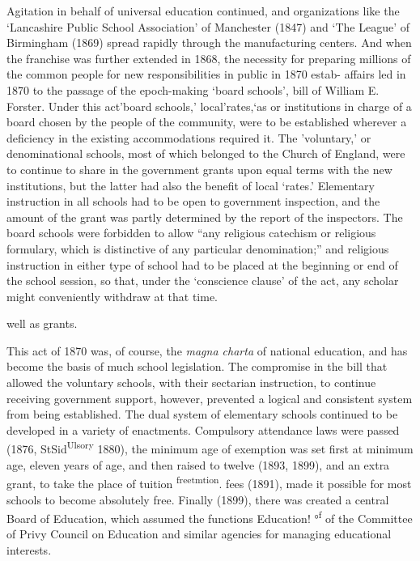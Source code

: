 \documentclass[
]{book}
\begin{document}
Agitation in behalf of universal education continued, and organizations like the `Lancashire Public School Association' of Manchester (1847) and `The League' of Birmingham (1869) spread rapidly through the manufacturing centers. And when the franchise was further extended in 1868, the necessity for preparing millions of the common people for new responsibilities in public in 1870 estab- affairs led in 1870 to the passage of the epoch-making `board schools', bill of William E. Forster. Under this act'board schools,' local'rates,`as or institutions in charge of a board chosen by the people of the community, were to be established wherever a deficiency in the existing accommodations required it. The 'voluntary,' or denominational schools, most of\protect\hypertarget{ch25.xmlux5cux23para.466.1.0.box.97.242.1054.693.q.60}{}{ which belonged to the Church of England, were to continue to share in the government grants upon equal terms with the new institutions, but the latter had also the benefit of local `rates.' Elementary instruction in all schools had to be open to government inspection, and the amount of the grant was partly determined by the report of the inspectors. The board schools were forbidden to allow ``any religious catechism or religious formulary, which is distinctive of any particular denomination;'' and religious instruction in either type of school had to be placed at the beginning or end of the school session, so that, under the `conscience clause' of the act, any scholar might conveniently withdraw at that time.}

well as grants.

This act of 1870 was, of course, the \emph{magna charta} of national education, and has become the basis of much school legislation. The compromise in the bill that allowed the voluntary schools, with their sectarian instruction, to continue receiving government support, however, prevented a logical and consistent system from being established. The dual system of elementary schools continued to be developed in a variety of enactments. Compulsory attendance laws were passed (1876, StSid\textsuperscript{Ulsory} 1880), the minimum age of exemption was set first at minimum age, eleven years of age, and then raised to twelve (1893, 1899), and an extra grant, to take the place of tuition \textsuperscript{freetmtion}. fees (1891), made it possible for most schools to become absolutely free. Finally (1899), there was created a central Board of Education, which assumed the functions Education! °\textsuperscript{f} of the Committee of Privy Council on Education and similar agencies for managing educational interests.
\end{document}
